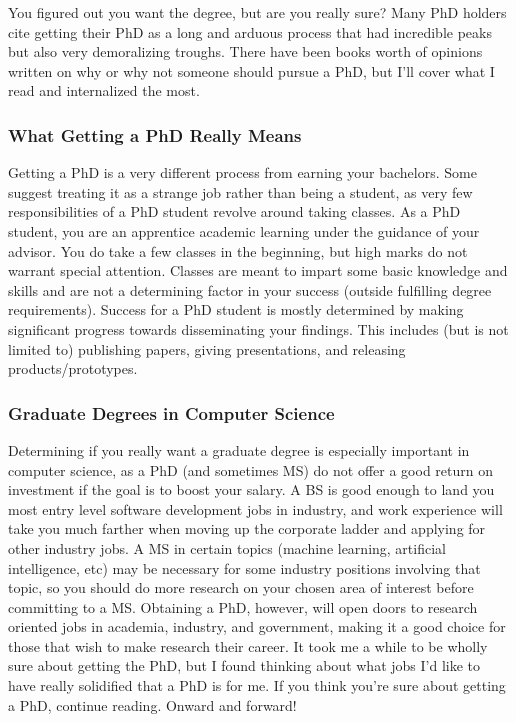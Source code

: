 \documentclass[12pt]{article}
\begin{document}
You figured out you want the degree, but are you really sure? Many PhD holders cite getting their PhD as a long and arduous process that had incredible peaks but also very demoralizing troughs. \cite{AzumaPhD} There have been books worth of opinions written on why or why not someone should pursue a PhD, but I'll cover what I read and internalized the most.

\subsubsection{What Getting a PhD Really Means}

Getting a PhD is a very different process from earning your bachelors. Some suggest treating it as a strange job rather than being a student, as very few responsibilities of a PhD student revolve around taking classes. \cite{AzumaPhD} As a PhD student, you are an apprentice academic learning under the guidance of your advisor. You do take a few classes in the beginning, but high marks do not warrant special attention. Classes are meant to impart some basic knowledge and skills and are not a determining factor in your success (outside fulfilling degree requirements). Success for a PhD student is mostly determined by making significant progress towards disseminating your findings. This includes (but is not limited to) publishing papers, giving presentations, and releasing products/prototypes.

\subsubsection{Graduate Degrees in Computer Science}

Determining if you really want a graduate degree is especially important in computer science, as a PhD (and sometimes MS) do not offer a good return on investment if the goal is to boost your salary. A BS is good enough to land you most entry level software development jobs in industry, and work experience will take you much farther when moving up the corporate ladder and applying for other industry jobs. A MS in certain topics (machine learning, artificial intelligence, etc) may be necessary for some industry positions involving that topic, so you should do more research on your chosen area of interest before committing to a MS. Obtaining a PhD, however, will open doors to research oriented jobs in academia, industry, and government, making it a good choice for those that wish to make research their career. \cite{robertsonwebsite} It took me a while to be wholly sure about getting the PhD, but I found thinking about what jobs I'd like to have really solidified that a PhD is for me. If you think you're sure about getting a PhD, continue reading. Onward and forward!
\end{document}
